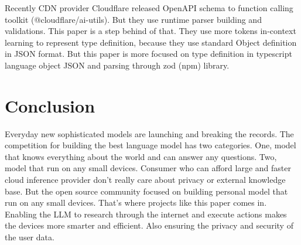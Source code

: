\documentclass[conference]{IEEEtran}
\begin{document}
Recently CDN provider Cloudflare released OpenAPI schema to function calling
toolkit (@cloudflare/ai-utils). But they use runtime parser building and
validations. This paper is a step behind of that. They use more tokens
in-context learning to represent type definition, because they use standard
Object definition in JSON format. But this paper is more focused on type
definition in typescript language object JSON and parsing through zod (npm)
library.





\section{Conclusion}
Everyday new sophisticated models are launching and breaking the records. The
competition for building the best language model has two categories. One, model
that knows everything about the world and can answer any questions. Two, model
that run on any small devices. Consumer who can afford large and faster cloud
inference provider don't really care about privacy or external knowledge base.
But the open source community focused on building personal model that run on
any small devices. That's where projects like this paper comes in. Enabling the
LLM to research through the internet and execute actions makes the devices more
smarter and efficient. Also ensuring the privacy and security of the user data.
\end{document}
